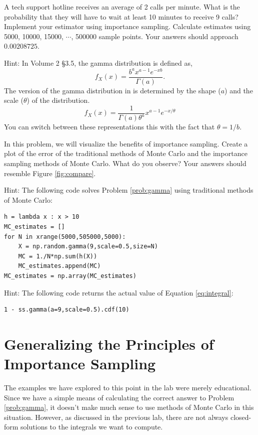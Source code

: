 \begin{problem} \label{prob:gamma}
A tech support hotline receives an average of 2 calls per minute. What is the probability that they will have to wait at least 10 minutes to receive 9 calls? Implement your estimator using importance sampling. Calculate estimates using 5000, 10000, 15000, $\cdots$, 500000 sample points. Your answers should approach $0.00208725$.

Hint: In Volume 2 \S 3.5, the gamma distribution is defined as, $$f_X(x) = \frac{b^{a}x^{a-1}e^{-xb}}{\Gamma(a)}.$$ The version of the gamma distribution in  is determined by the shape ($a$) and the scale ($\theta$) of the distribution. $$f_X(x) = \frac{1}{\Gamma(a)\theta^a}x^{a-1}e^{-x/\theta}$$
You can switch between these representations this with the fact that $\theta = 1/b$.
\end{problem}

\begin{problem}
In this problem, we will visualize the benefits of importance sampling. Create a plot of the error of the traditional methods of Monte Carlo and the importance sampling methods of Monte Carlo. What do you observe? Your answers should resemble Figure \ref{fig:compare}.

Hint: The following code solves Problem \ref{prob:gamma} using traditional methods of Monte Carlo:
\begin{lstlisting}
h = lambda x : x > 10
MC_estimates = []
for N in xrange(5000,505000,5000):
    X = np.random.gamma(9,scale=0.5,size=N)
    MC = 1./N*np.sum(h(X))    
    MC_estimates.append(MC)
MC_estimates = np.array(MC_estimates)
\end{lstlisting}

Hint: The following code returns the actual value of Equation \ref{eq:integral}:
\begin{lstlisting}
1 - ss.gamma(a=9,scale=0.5).cdf(10)
\end{lstlisting}
\end{problem}

\section*{Generalizing the Principles of Importance Sampling}
The examples we have explored to this point in the lab were merely educational. Since we have a simple means of calculating the correct answer to Problem \ref{prob:gamma}, it doesn't make much sense to use methods of Monte Carlo in this situation. However, as discussed in the previous lab, there are not always closed-form solutions to the integrals we want to compute.

